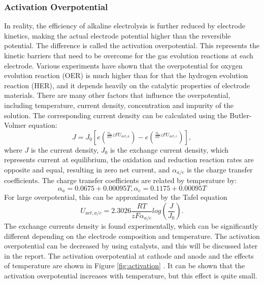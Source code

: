 \documentclass[11pt, a4paper]{article}
\begin{document}
\subsubsection{Activation Overpotential}
In reality, the efficiency of alkaline electrolysis is further reduced by electrode kinetics, making the actual electrode potential higher than the reversible potential. The difference is called the activation overpotential. This represents the kinetic barriers that need to be overcome for the gas evolution reactions at each electrode. Various experiments have shown that the overpotential for oxygen evolution reaction (OER) is much higher than for that the hydrogen evolution reaction (HER), and it depends heavily on the catalytic properties of electrode materials. \cite{activation} There are many other factors that influence the overpotential, including temperature, current density, concentration and impurity of the solution.
The corresponding current density can be calculated using the Butler-Volmer equation: \cite{activation1}
\begin{equation} 
J = J_0 [e(^{\frac{\alpha_a}{RT}zFU_{act,a}}) - e(^{\frac{\alpha_c}{RT}zFU_{act,c}})],
\end{equation}
where $J$ is the current density, $J_0$ is the exchange current density, which represents current at equilibrium, the oxidation and reduction reaction rates are opposite and equal, resulting in zero net current, and  $\alpha_{a/c}$ is the charge transfer coefficients. The charge transfer coefficients are related by temperature by:\cite{activation4}
\begin{equation} 
\alpha_a = 0.0675 + 0.00095T,   \alpha_c = 0.1175+0.00095T
\end{equation} 
For large overpotential, this can be approximated by the Tafel equation\cite{activation2} 
\begin{equation} 
U_{act,a/c} = 2.3026 \frac{RT}{zF\alpha_{a/c}} log(\frac{J}{J_0}).
\end{equation}
The exchange currents density is found experimentally, which can be significantly different depending on the electrode composition and temperature. The activation overpotential can be decreased by using catalysts, and this will be discussed later in the report. The activation overpotential at cathode and anode and the effects of temperature are shown in Figure \ref{fig:activation} . It can be shown that the activation overpotential increases with temperature, but this effect is quite small.
\end{document}
